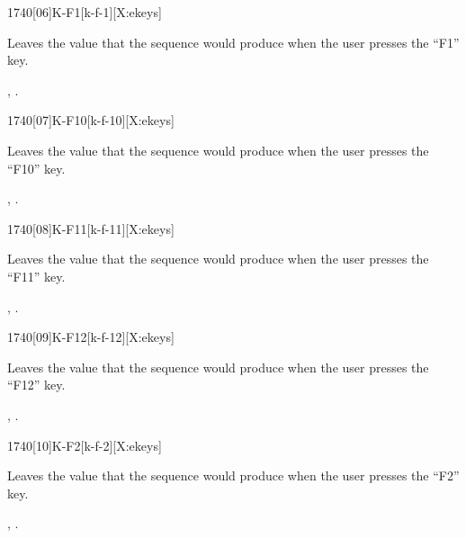 \begin{worddef}{1740}[06]{K-F1}[k-f-1][X:ekeys]
\item {}

	Leaves the value  that the sequence 
	 would produce when the user presses the
	``F1'' key.

\see {},
	.
\end{worddef}


\begin{worddef}{1740}[07]{K-F10}[k-f-10][X:ekeys]
\item {}

	Leaves the value  that the sequence 
	 would produce when the user presses the
	``F10'' key.

\see {},
	.
\end{worddef}


\begin{worddef}{1740}[08]{K-F11}[k-f-11][X:ekeys]
\item {}

	Leaves the value  that the sequence 
	 would produce when the user presses the
	``F11'' key.

\see {},
	.
\end{worddef}


\begin{worddef}{1740}[09]{K-F12}[k-f-12][X:ekeys]
\item {}

	Leaves the value  that the sequence 
	 would produce when the user presses the
	``F12'' key.

\see {},
	.
\end{worddef}


\begin{worddef}{1740}[10]{K-F2}[k-f-2][X:ekeys]
\item {}

	Leaves the value  that the sequence 
	 would produce when the user presses the
	``F2'' key.

\see {},
	.
\end{worddef}


